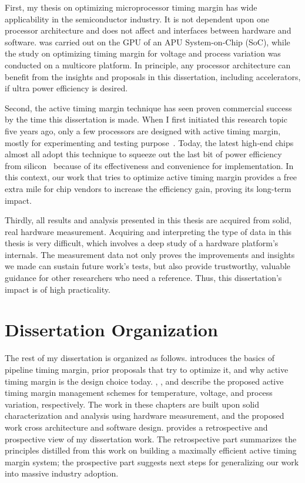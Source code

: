 First, my thesis on optimizing microprocessor timing margin has wide applicability in the semiconductor industry. It is not dependent upon one processor architecture and does not affect and interfaces between hardware and software. \tistates was carried out on the GPU of an APU System-on-Chip (SoC), while the study on optimizing timing margin for voltage and process variation was conducted on a multicore platform. In principle, any processor architecture can benefit from the insights and proposals in this dissertation, including accelerators, if ultra power efficiency is desired. 

Second, the active timing margin technique has seen proven commercial success by the time this dissertation is made. When I first initiated this research topic five years ago, only a few processors are designed with active timing margin, mostly for experimenting and testing purpose~\cite{lefurgy2011active, bowman201222nm}. Today, the latest high-end chips almost all adopt this technique to squeeze out the last bit of power efficiency from silicon~\cite{tokunaga20145,grenat20145,bowman20158,webel2015robust,vezyrtzis2018droop} because of its effectiveness and convenience for implementation. In this context, our work that tries to optimize active timing margin provides a free extra mile for chip vendors to increase the efficiency gain, proving its long-term impact.

Thirdly, all results and analysis presented in this thesis are acquired from solid, real hardware measurement. Acquiring and interpreting the type of data in this thesis is very difficult, which involves a deep study of a hardware platform's internals. The measurement data not only proves the improvements and insights we made can sustain future work's tests, but also provide trustworthy, valuable guidance for other researchers who need a reference. Thus, this dissertation's impact is of high practicality.


\section{Dissertation Organization}
\label{sec:intro:outline}

The rest of my dissertation is organized as follows. 
 introduces the basics of pipeline timing margin, prior proposals that try to optimize it, and why active timing margin is the design choice today. 
, , and  describe the proposed active timing margin management schemes for temperature, voltage, and process variation, respectively. The work in these chapters are built upon solid characterization and analysis using hardware measurement, and the proposed work cross architecture and software design.  provides a retrospective and prospective view of my dissertation work. The retrospective part summarizes the principles distilled from this work on building a maximally efficient active timing margin system; the prospective part suggests next steps for generalizing our work into massive industry adoption.

